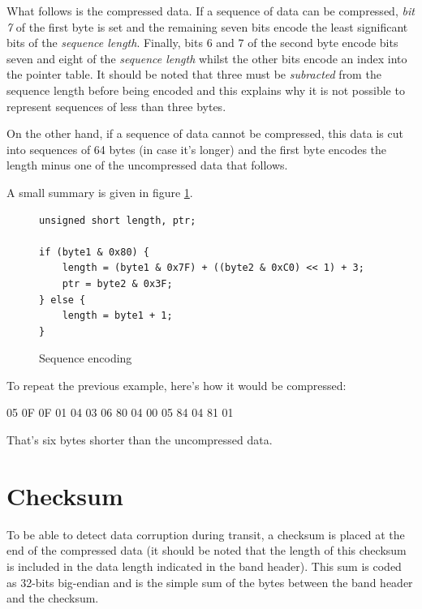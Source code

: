 What follows is the compressed data.
If a sequence of data can be compressed, \emph{bit 7} of the first byte is
set and the remaining seven bits encode the least significant bits of the
\emph{sequence length}.  Finally, bits $6$ and $7$ of the second byte encode
bits seven and eight of the \emph{sequence length} whilst the other bits encode
an index into the pointer table.
It should be noted that three must be \emph{subracted} from the sequence length
before being encoded and this explains why it is not possible to represent
sequences of less than three bytes.

On the other hand, if a sequence of data cannot be compressed,
this data is cut into sequences of 64 bytes (in case it's longer)
and the first byte encodes the length minus one of the uncompressed data that follows.

A small summary is given in figure \ref{fig:code_comp}.
\begin{figure}[!ht]
\centering
\begin{verbatim}
unsigned short length, ptr;

if (byte1 & 0x80) {
    length = (byte1 & 0x7F) + ((byte2 & 0xC0) << 1) + 3;
    ptr = byte2 & 0x3F;
} else {
    length = byte1 + 1;
}
\end{verbatim}
\caption{Sequence encoding}
\label{fig:code_comp}
\end{figure}

To repeat the previous example, here's how it would be compressed:
\begin{exemple}
05 0F 0F 01 04 03 06 80 04 00 05 84 04 81 01
\end{exemple}

That's six bytes shorter than the uncompressed data.

\section{Checksum}
To be able to detect data corruption during transit, a
checksum is placed at the end of the compressed data (it should be noted
that the length of this checksum is included in the 
data length indicated in the band header).
This sum is coded
as 32-bits big-endian and is the simple sum of the bytes between
the band header and the checksum.


